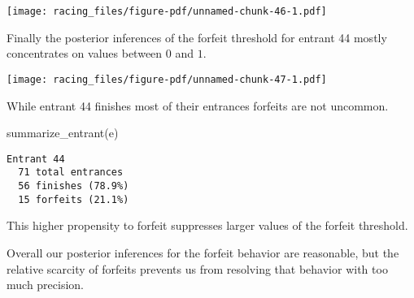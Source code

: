 \documentclass[
  letterpaper,
  DIV=11,
  numbers=noendperiod]{scrartcl}
\newenvironment{Shaded}{\begin{snugshade}}{\end{snugshade}}
\newcommand{\AttributeTok}[1]{\textcolor[rgb]{0.40,0.45,0.13}{#1}}
\newcommand{\DecValTok}[1]{\textcolor[rgb]{0.68,0.00,0.00}{#1}}
\newcommand{\FunctionTok}[1]{\textcolor[rgb]{0.28,0.35,0.67}{#1}}
\newcommand{\NormalTok}[1]{\textcolor[rgb]{0.00,0.23,0.31}{#1}}
\newcommand{\OtherTok}[1]{\textcolor[rgb]{0.00,0.23,0.31}{#1}}
\newcommand{\SpecialCharTok}[1]{\textcolor[rgb]{0.37,0.37,0.37}{#1}}
\newcommand{\StringTok}[1]{\textcolor[rgb]{0.13,0.47,0.30}{#1}}
\begin{document}
\texttt{[image: racing\_files/figure-pdf/unnamed-chunk-46-1.pdf]}

Finally the posterior inferences of the forfeit threshold for entrant 44
mostly concentrates on values between \(0\) and \(1\).

\begin{Shaded}
\end{Shaded}

\texttt{[image: racing\_files/figure-pdf/unnamed-chunk-47-1.pdf]}

While entrant 44 finishes most of their entrances forfeits are not
uncommon.

\begin{Shaded}
\begin{Highlighting}[]
\FunctionTok{summarize\_entrant}\NormalTok{(e)}
\end{Highlighting}
\end{Shaded}

\begin{verbatim}
Entrant 44
  71 total entrances
  56 finishes (78.9%)
  15 forfeits (21.1%)
\end{verbatim}

This higher propensity to forfeit suppresses larger values of the
forfeit threshold.

Overall our posterior inferences for the forfeit behavior are
reasonable, but the relative scarcity of forfeits prevents us from
resolving that behavior with too much precision.
\end{document}
